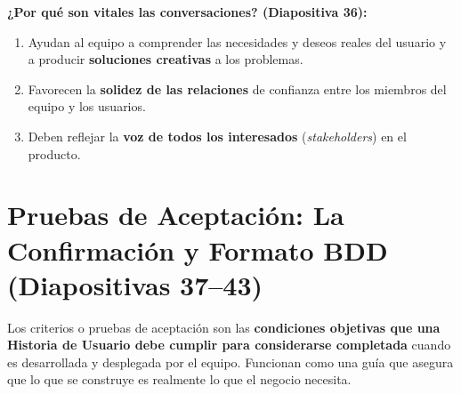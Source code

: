 \textbf{¿Por qué son vitales las conversaciones? (Diapositiva 36):}
\begin{enumerate}[label=\textbf{\arabic*.}, itemsep=2pt]
    \item Ayudan al equipo a comprender las necesidades y deseos reales del usuario y a producir \textbf{soluciones creativas} a los problemas.
    \item Favorecen la \textbf{solidez de las relaciones} de confianza entre los miembros del equipo y los usuarios.
    \item Deben reflejar la \textbf{voz de todos los interesados} (\textit{stakeholders}) en el producto.
\end{enumerate}

\section{Pruebas de Aceptación: La Confirmación y Formato BDD (Diapositivas 37--43)}

\begin{definicion}
Los criterios o pruebas de aceptación son las \textbf{condiciones objetivas que una Historia de Usuario debe cumplir para considerarse completada} cuando es desarrollada y desplegada por el equipo. Funcionan como una guía que asegura que lo que se construye es realmente lo que el negocio necesita.
\end{definicion}

